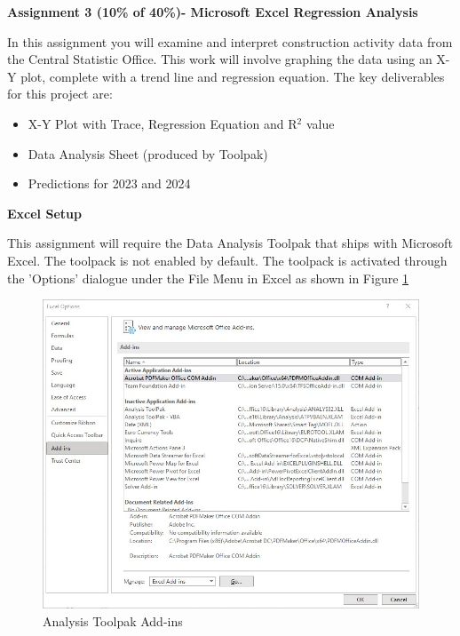 
	
\begin{flushleft}
\Large\textbf{Assignment 3 (10\% of 40\%)- Microsoft Excel Regression Analysis }\\
\end{flushleft}

In this assignment you will examine and interpret construction activity data from the Central Statistic Office.  This work will involve graphing the data using an X-Y plot, complete with a trend line and regression equation.  The key deliverables for this project are:

\begin{itemize}
	\item X-Y Plot with Trace, Regression Equation and R$^{2}$ value
	\item Data Analysis Sheet (produced by Toolpak)
	\item Predictions for 2023 and 2024

\end{itemize}


\textbf{Excel Setup}

This assignment will require the Data Analysis Toolpak that ships with Microsoft Excel.  The toolpack is not enabled by default.  The toolpack is activated through the 'Options' dialogue under the File Menu in Excel as shown in Figure \ref{fig:AddinsImage}\\


\begin{figure}
	\centering
	\includegraphics[width=1.0\linewidth]{./img/AddinsImage.jpg}
	\caption{Analysis Toolpak Add-ins}
	\label{fig:AddinsImage}
\end{figure}


